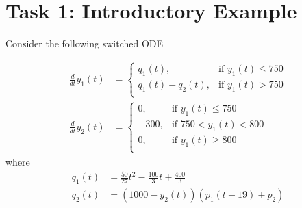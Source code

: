 \section*{Task 1: Introductory Example}

Consider the following switched ODE

\begin{equation}\label{eq:task1_rhs}
\begin{aligned}
\frac{d}{dt}y_1(t) &= 
\begin{cases}
	q_1(t), & \text{if } y_1(t) \leq 750 \\
	q_1(t) - q_2(t),  & \text{if } y_1(t) > 750 \\
\end{cases} \\
\frac{d}{dt}y_2(t) &= 
\begin{cases}
	0, & \text{if } y_1(t) \leq 750 \\
	-300, & \text{if } 750 < y_1(t) < 800 \\
	0, & \text{if } y_1(t) \geq 800 \\
\end{cases}
\end{aligned}
\end{equation}
where
\begin{equation}\label{eq:task1_rhs_helpers}
\begin{aligned}
q_1(t) &= \frac{50}{27}t^2 - \frac{100}{3}t + \frac{400}{3} \\
q_2(t) &= (1000 - y_2(t))(p_1(t-19) + p_2)
\end{aligned}
\end{equation}

